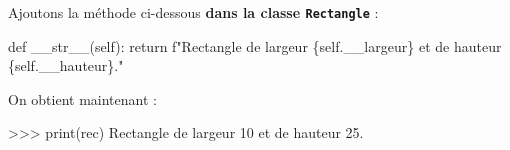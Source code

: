 \documentclass[
  letterpaper,
  DIV=11,
  numbers=noendperiod]{scrartcl}
\newenvironment{Shaded}{\begin{snugshade}}{\end{snugshade}}
\newcommand{\BuiltInTok}[1]{\textcolor[rgb]{0.00,0.23,0.31}{#1}}
\newcommand{\ControlFlowTok}[1]{\textcolor[rgb]{0.00,0.23,0.31}{#1}}
\newcommand{\DecValTok}[1]{\textcolor[rgb]{0.68,0.00,0.00}{#1}}
\newcommand{\FloatTok}[1]{\textcolor[rgb]{0.68,0.00,0.00}{#1}}
\newcommand{\FunctionTok}[1]{\textcolor[rgb]{0.28,0.35,0.67}{#1}}
\newcommand{\KeywordTok}[1]{\textcolor[rgb]{0.00,0.23,0.31}{#1}}
\newcommand{\NormalTok}[1]{\textcolor[rgb]{0.00,0.23,0.31}{#1}}
\newcommand{\OperatorTok}[1]{\textcolor[rgb]{0.37,0.37,0.37}{#1}}
\newcommand{\SpecialCharTok}[1]{\textcolor[rgb]{0.37,0.37,0.37}{#1}}
\newcommand{\SpecialStringTok}[1]{\textcolor[rgb]{0.13,0.47,0.30}{#1}}
\newcommand{\VariableTok}[1]{\textcolor[rgb]{0.07,0.07,0.07}{#1}}
\begin{document}
Ajoutons la méthode ci-dessous \textbf{dans la classe
\texttt{Rectangle}} :

\begin{Shaded}
\begin{Highlighting}[]
\KeywordTok{def} \FunctionTok{\_\_str\_\_}\NormalTok{(}\VariableTok{self}\NormalTok{):}
    \ControlFlowTok{return} \SpecialStringTok{f"Rectangle de largeur }\SpecialCharTok{\{}\VariableTok{self}\SpecialCharTok{.}\NormalTok{\_\_largeur}\SpecialCharTok{\}}\SpecialStringTok{ et de hauteur }\SpecialCharTok{\{}\VariableTok{self}\SpecialCharTok{.}\NormalTok{\_\_hauteur}\SpecialCharTok{\}}\SpecialStringTok{."}
\end{Highlighting}
\end{Shaded}

On obtient maintenant :

\begin{Shaded}
\begin{Highlighting}[]
\OperatorTok{\textgreater{}\textgreater{}\textgreater{}} \BuiltInTok{print}\NormalTok{(rec)}
\NormalTok{Rectangle de largeur }\DecValTok{10}\NormalTok{ et de hauteur }\FloatTok{25.}
\end{Highlighting}
\end{Shaded}
\end{document}
